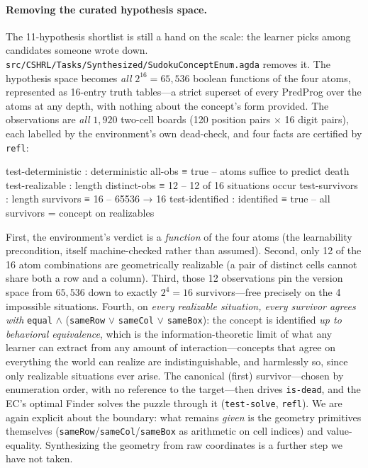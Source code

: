 \documentclass[9pt,a4paper]{article}
\newcommand{\fpath}[1]{\nolinkurl{#1}}
\theoremstyle{plain}
\theoremstyle{definition}
\theoremstyle{remark}
\begin{document}
\paragraph{Removing the curated hypothesis space.}  The 11-hypothesis shortlist is still a hand on the scale: the learner picks among candidates someone wrote down.  \fpath{src/CSHRL/Tasks/Synthesized/SudokuConceptEnum.agda} removes it.  The hypothesis space becomes \emph{all} $2^{16} = 65{,}536$ boolean functions of the four atoms, represented as 16-entry truth tables---a strict superset of every PredProg over the atoms at any depth, with nothing about the concept's form provided.  The observations are \emph{all} $1{,}920$ two-cell boards (120 position pairs $\times$ 16 digit pairs), each labelled by the environment's own dead-check, and four facts are certified by \texttt{refl}:
\begin{spec}
test-deterministic : deterministic all-obs ≡ true       -- atoms suffice to predict death
test-realizable    : length distinct-obs ≡ 12           -- 12 of 16 situations occur
test-survivors     : length survivors ≡ 16              -- 65536 → 16
test-identified    : identified ≡ true                  -- all survivors = concept on realizables
\end{spec}
First, the environment's verdict is a \emph{function} of the four atoms (the learnability precondition, itself machine-checked rather than assumed).  Second, only 12 of the 16 atom combinations are geometrically realizable (a pair of distinct cells cannot share both a row and a column).  Third, those 12 observations pin the version space from $65{,}536$ down to exactly $2^4 = 16$ survivors---free precisely on the 4 impossible situations.  Fourth, on \emph{every realizable situation, every survivor agrees with} \texttt{equal} $\wedge$ (\texttt{sameRow} $\vee$ \texttt{sameCol} $\vee$ \texttt{sameBox}): the concept is identified \emph{up to behavioral equivalence}, which is the information-theoretic limit of what any learner can extract from any amount of interaction---concepts that agree on everything the world can realize are indistinguishable, and harmlessly so, since only realizable situations ever arise.  The canonical (first) survivor---chosen by enumeration order, with no reference to the target---then drives \texttt{is-dead}, and the EC's optimal Finder solves the puzzle through it (\texttt{test-solve}, \texttt{refl}).  We are again explicit about the boundary: what remains \emph{given} is the geometry primitives themselves (\texttt{sameRow}/\texttt{sameCol}/\texttt{sameBox} as arithmetic on cell indices) and value-equality.  Synthesizing the geometry from raw coordinates is a further step we have not taken.
\end{document}

